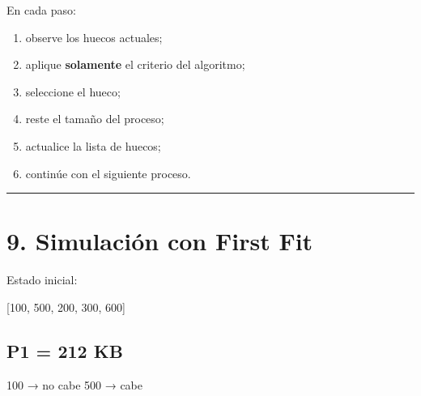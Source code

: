 \documentclass[
  spanish,
  letterpaper,
]{scrbook}
\newenvironment{Shaded}{\begin{snugshade}}{\end{snugshade}}
\newcommand{\NormalTok}[1]{\textcolor[rgb]{0.00,0.23,0.31}{#1}}
\providecommand{\tightlist}{%
  \setlength{\itemsep}{0pt}\setlength{\parskip}{0pt}}
\begin{document}
\begin{tcolorbox}[enhanced jigsaw, arc=.35mm, bottomrule=.15mm, bottomtitle=1mm, breakable, colback=white, colbacktitle=quarto-callout-tip-color!10!white, colframe=quarto-callout-tip-color-frame, coltitle=black, left=2mm, leftrule=.75mm, opacityback=0, opacitybacktitle=0.6, rightrule=.15mm, title=\textcolor{quarto-callout-tip-color}{\faLightbulb}\hspace{0.5em}{Método de trabajo}, titlerule=0mm, toprule=.15mm, toptitle=1mm]

En cada paso:

\begin{enumerate}
\def\labelenumi{\arabic{enumi}.}
\tightlist
\item
  observe los huecos actuales;
\item
  aplique \textbf{solamente} el criterio del algoritmo;
\item
  seleccione el hueco;
\item
  reste el tamaño del proceso;
\item
  actualice la lista de huecos;
\item
  continúe con el siguiente proceso.
\end{enumerate}

\end{tcolorbox}

\begin{center}\rule{0.5\linewidth}{0.5pt}\end{center}


\chapter{9. Simulación con First
Fit}\label{simulaciuxf3n-con-first-fit-1}

Estado inicial:

\begin{Shaded}
\begin{Highlighting}[]
\NormalTok{[100, 500, 200, 300, 600]}
\end{Highlighting}
\end{Shaded}

\section{P1 = 212 KB}\label{p1-212-kb-3}

\begin{Shaded}
\begin{Highlighting}[]
\NormalTok{100 → no cabe}
\NormalTok{500 → cabe}
\end{Highlighting}
\end{Shaded}
\end{document}
